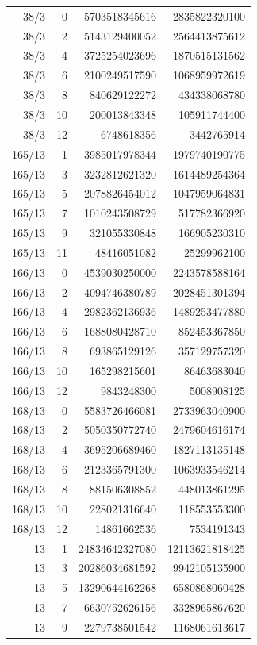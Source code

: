 \begin{longtable}{@{}rrrr@{}}
38/3 & 0 & 5703518345616 & 2835822320100\\
38/3 & 2 & 5143129400052 & 2564413875612\\
38/3 & 4 & 3725254023696 & 1870515131562\\
38/3 & 6 & 2100249517590 & 1068959972619\\
38/3 & 8 & 840629122272 & 434338068780\\
38/3 & 10 & 200013843348 & 105911744400\\
38/3 & 12 & 6748618356 & 3442765914\\
165/13 & 1 & 3985017978344 & 1979740190775\\
165/13 & 3 & 3232812621320 & 1614489254364\\
165/13 & 5 & 2078826454012 & 1047959064831\\
165/13 & 7 & 1010243508729 & 517782366920\\
165/13 & 9 & 321055330848 & 166905230310\\
165/13 & 11 & 48416051082 & 25299962100\\
166/13 & 0 & 4539030250000 & 2243578588164\\
166/13 & 2 & 4094746380789 & 2028451301394\\
166/13 & 4 & 2982362136936 & 1489253477880\\
166/13 & 6 & 1688080428710 & 852453367850\\
166/13 & 8 & 693865129126 & 357129757320\\
166/13 & 10 & 165298215601 & 86463683040\\
166/13 & 12 & 9843248300 & 5008908125\\
168/13 & 0 & 5583726466081 & 2733963040900\\
168/13 & 2 & 5050350772740 & 2479604616174\\
168/13 & 4 & 3695206689460 & 1827113135148\\
168/13 & 6 & 2123365791300 & 1063933546214\\
168/13 & 8 & 881506308852 & 448013861295\\
168/13 & 10 & 228021316640 & 118553553300\\
168/13 & 12 & 14861662536 & 7534191343\\
13 & 1 & 24834642327080 & 12113621818425\\
13 & 3 & 20286034681592 & 9942105135900\\
13 & 5 & 13290644162268 & 6580868060428\\
13 & 7 & 6630752626156 & 3328965867620\\
13 & 9 & 2279738501542 & 1168061613617\\

\end{longtable}
